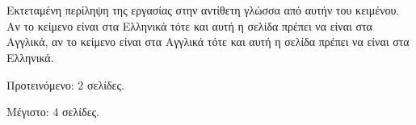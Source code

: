 \chapter*{\cseextabstract}
\addstarredchapter{\cseextabstract} %
\makecseextabstract


\noindent Εκτεταμένη περίληψη της εργασίας στην αντίθετη γλώσσα από αυτήν του κειμένου.
Αν το κείμενο είναι στα Ελληνικά τότε και αυτή η σελίδα πρέπει να είναι στα Αγγλικά, αν το κείμενο είναι στα Αγγλικά τότε και αυτή η σελίδα πρέπει να είναι στα Ελληνικά.

\bigskip

\noindent Προτεινόμενο: 2 σελίδες.

\noindent Μέγιστο: 4 σελίδες.